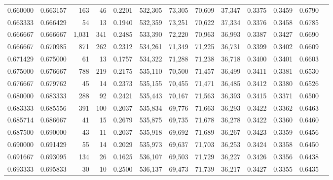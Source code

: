 \begin{tabular}{rrrrrrrrrrrrr}
0.660000 & 0.663157 &    163 &     46 &                                     0.2201 & 532,305 &  73,305 &  70,609 &  37,347 & 0.3375 & 0.3459 & 0.6790 \\
0.663333 & 0.666429 &     54 &     13 &                                     0.1940 & 532,359 &  73,251 &  70,622 &  37,334 & 0.3376 & 0.3458 & 0.6785 \\
0.666667 & 0.666667 &  1,031 &    341 &                                     0.2485 & 533,390 &  72,220 &  70,963 &  36,993 & 0.3387 & 0.3427 & 0.6690 \\
0.666667 & 0.670985 &    871 &    262 &                                     0.2312 & 534,261 &  71,349 &  71,225 &  36,731 & 0.3399 & 0.3402 & 0.6609 \\
0.671429 & 0.675000 &     61 &     13 &                                     0.1757 & 534,322 &  71,288 &  71,238 &  36,718 & 0.3400 & 0.3401 & 0.6603 \\
0.675000 & 0.676667 &    788 &    219 &                                     0.2175 & 535,110 &  70,500 &  71,457 &  36,499 & 0.3411 & 0.3381 & 0.6530 \\
0.676667 & 0.679762 &     45 &     14 &                                     0.2373 & 535,155 &  70,455 &  71,471 &  36,485 & 0.3412 & 0.3380 & 0.6526 \\
0.680000 & 0.683333 &    288 &     92 &                                     0.2421 & 535,443 &  70,167 &  71,563 &  36,393 & 0.3415 & 0.3371 & 0.6500 \\
0.683333 & 0.685556 &    391 &    100 &                                     0.2037 & 535,834 &  69,776 &  71,663 &  36,293 & 0.3422 & 0.3362 & 0.6463 \\
0.685714 & 0.686667 &     41 &     15 &                                     0.2679 & 535,875 &  69,735 &  71,678 &  36,278 & 0.3422 & 0.3360 & 0.6460 \\
0.687500 & 0.690000 &     43 &     11 &                                     0.2037 & 535,918 &  69,692 &  71,689 &  36,267 & 0.3423 & 0.3359 & 0.6456 \\
0.690000 & 0.691429 &     55 &     14 &                                     0.2029 & 535,973 &  69,637 &  71,703 &  36,253 & 0.3424 & 0.3358 & 0.6450 \\
0.691667 & 0.693095 &    134 &     26 &                                     0.1625 & 536,107 &  69,503 &  71,729 &  36,227 & 0.3426 & 0.3356 & 0.6438 \\
0.693333 & 0.695833 &     30 &     10 &                                     0.2500 & 536,137 &  69,473 &  71,739 &  36,217 & 0.3427 & 0.3355 & 0.6435 \\

\end{tabular}
